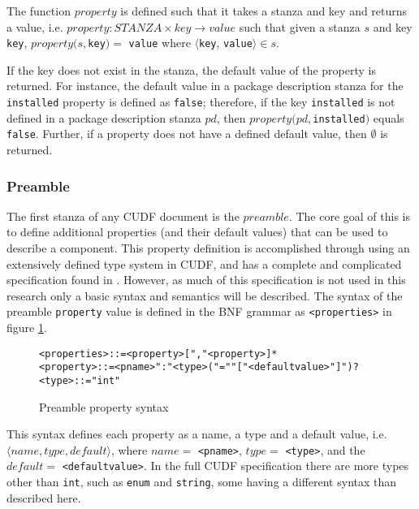 The function $property$ is defined such that it takes a stanza and key and returns a value,
i.e. $property: STANZA \times key \rightarrow value$ such that given a stanza $s$ and key \verb+key+,
$property(s,$\verb+key+$) = $ \verb+value+ where $\langle$\verb+key+, \verb+value+$ \rangle \in s$.

If the key does not exist in the stanza, the default value of the property is returned.
For instance, the default value in a package description stanza for the \verb+installed+ property is defined as \verb+false+;
therefore, if the key \verb+installed+ is not defined in a package description stanza $pd$, then $property(pd,$\verb+installed+$)$ equals \verb+false+.
Further, if a property does not have a defined default value, then $\emptyset$ is returned.

\subsubsection{Preamble}
The first stanza of any CUDF document is the $preamble$.
The core goal of this is to define additional properties (and their default values) that can be used to describe a component.
This property definition is accomplished through using an extensively defined type system in CUDF, and has a complete and complicated specification found in \cite{treinen2009common}.
However, as much of this specification is not used in this research only a basic syntax and semantics will be described.
The syntax of the preamble \verb+property+ value is defined in the BNF grammar as \verb+<properties>+ in figure \ref{formal.cudfpropertysyntax}.

\begin{figure}[htp] 
\begin{center}
\begin{alltt}
<properties> ::= <property> ["," <property>]*
<property> :: = <pname> ":" <type> ("=" "["<defaultvalue>"]")?
<type> ::= "int"
\end{alltt}
  \caption{Preamble property syntax}
  \label{formal.cudfpropertysyntax}
\end{center}
\end{figure}

This syntax defines each property as a name, a type and a default value, i.e. $\langle name, type, default \rangle$, where $name = $ \verb+<pname>+, $type = $ \verb+<type>+,
and the $default =$ \verb+<defaultvalue>+. 
In the full CUDF specification there are more types other than \verb+int+, such as \verb+enum+ and \verb+string+,
some having a different syntax than described here.

